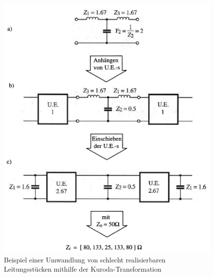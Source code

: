 \begin{figure}[h!]
    \centering
    \includegraphics[width=.8\linewidth]{images/kuroda-schieben}
    \caption{Beispiel einer Umwandlung von schlecht realisierbaren Leitungsst\"ucken mithilfe der Kuroda-Transformation}
    \label{fig:kuroda-schieben}
\end{figure}

